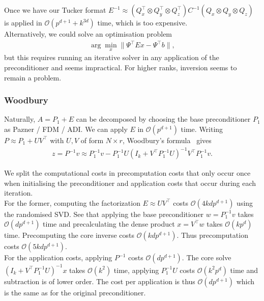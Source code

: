\documentclass[12pt]{report}
\theoremstyle{remark}
\begin{document}
Once we have our Tucker format $E^{-1} \approx (Q_x^\top \otimes Q_y^\top \otimes Q_z^\top) C^{-1} (Q_x \otimes Q_y \otimes Q_z)$ is applied in $\mathcal{O}(p^{d+1} + k^{3d})$ time, which is too expensive. \\

Alternatively, we could solve an optimisation problem 
\begin{align*}
\arg \min_x \|\Psi^\top E x - \Psi^\top b \|,
\end{align*} 
but this requires running an iterative solver in any application of the preconditioner and seems impractical. For higher ranks, inversion seems to remain a problem.

\subsubsection{Woodbury}
Naturally, $A = P_1 + E$ can be decomposed by choosing the base preconditioner $P_1$ as Pazner / FDM / ADI. We can apply $E$ in $\mathcal{O}(p^{d+1})$ time. Writing $P \approx P_1 + U V^\top$ with $U, V$ of form $N \times r$, Woodbury's formula~\cite{akgun2001fast} gives 
\begin{align*}
z = P^{-1} v \approx P_1^{-1} v - P_1^{-1} U (I_k + V^\top P_1^{-1} U)^{-1} V^\top P_1^{-1} v.
\end{align*}

We split the computational costs in precomputation costs that only occur once when initialising the preconditioner and application costs that occur during each iteration. \\

For the former, computing the factorization $E \approx UV^\top$ costs $\mathcal{O}(4k d p^{d+1})$ using the randomised SVD. See that applying the base preconditioner $w = P_1^{-1} v$ takes $\mathcal{O}(d p^{d+1})$ time and precalculating the dense product $x = V^\top w$ takes $\mathcal{O}(k p^d)$ time. Precomputing the core inverse costs $\mathcal{O}(k d p^{d+1})$. Thus precomputation costs $\mathcal{O}(5kd p^{d+1})$.\\

For the application costs, applying $P^{-1}$ costs $\mathcal{O}(d p^{d+1})$. The core solve $(I_k + V^\top P_1^{-1} U)^{-1} x$ takes $\mathcal{O}(k^2)$ time, applying $P_1^{-1}U$ costs $\mathcal{O}(k^2 p^d)$ time and subtraction is of lower order. The cost per application is thus $\mathcal{O}(d p^{d+1})$ which is the same as for the original preconditioner. \\
\end{document}
